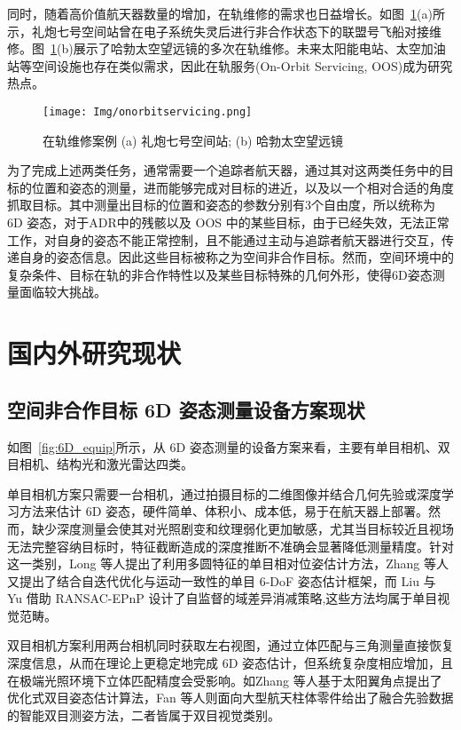 同时，随着高价值航天器数量的增加，在轨维修的需求也日益增长。如图~\ref{fig:space_repaire}(a)所示，礼炮七号空间站曾在电子系统失灵后进行非合作状态下的联盟号飞船对接维修。图~\ref{fig:space_repaire}(b)展示了哈勃太空望远镜的多次在轨维修。未来太阳能电站、太空加油站等空间设施也存在类似需求，因此在轨服务(On-Orbit Servicing, OOS)\cite{alizadeh2024comprehensive, wang2025review}成为研究热点。
\begin{figure}[htbp]
	\centering
	\texttt{[image: Img/onorbitservicing.png]}
	\caption{在轨维修案例 (a) 礼炮七号空间站; (b) 哈勃太空望远镜}
	\label{fig:space_repaire}
\end{figure}

为了完成上述两类任务，通常需要一个追踪者航天器，通过其对这两类任务中的目标的位置和姿态的测量，进而能够完成对目标的进近，以及以一个相对合适的角度抓取目标。其中测量出目标的位置和姿态的参数分别有3个自由度，所以统称为 6D 姿态，对于ADR中的残骸以及 OOS 中的某些目标，由于已经失效，无法正常工作，对自身的姿态不能正常控制，且不能通过主动与追踪者航天器进行交互，传递自身的姿态信息。因此这些目标被称之为空间非合作目标。然而，空间环境中的复杂条件\cite{aerospace10120997}、目标在轨的非合作特性\cite{PAULY2023339}以及某些目标特殊的几何外形，使得6D姿态测量面临较大挑战。


\section{国内外研究现状}
\subsection{空间非合作目标 6D 姿态测量设备方案现状}
如图~\ref{fig:6D_equip}所示，从 6D 姿态测量的设备方案来看，主要有单目相机、双目相机、结构光和激光雷达四类。

单目相机方案只需要一台相机，通过拍摄目标的二维图像并结合几何先验或深度学习方法来估计 6D 姿态，硬件简单、体积小、成本低，易于在航天器上部署。然而，缺少深度测量会使其对光照剧变和纹理弱化更加敏感，尤其当目标较近且视场无法完整容纳目标时，特征截断造成的深度推断不准确会显著降低测量精度。针对这一类别，Long 等人提出了利用多圆特征的单目相对位姿估计方法\cite{9802504}，Zhang 等人又提出了结合自迭代优化与运动一致性的单目 6-DoF 姿态估计框架\cite{Zhang_2024_CVPR}，而 Liu 与 Yu 借助 RANSAC-EPnP 设计了自监督的域差异消减策略\cite{Liu_2024_CVPR},这些方法均属于单目视觉范畴。

双目相机方案利用两台相机同时获取左右视图，通过立体匹配与三角测量直接恢复深度信息，从而在理论上更稳定地完成 6D 姿态估计，但系统复杂度相应增加，且在极端光照环境下立体匹配精度会受影响。如Zhang 等人基于太阳翼角点提出了优化式双目姿态估计算法\cite{zhang2017optimization}，Fan 等人则面向大型航天柱体零件给出了融合先验数据的智能双目测姿方法\cite{Fan2024}，二者皆属于双目视觉类别。

